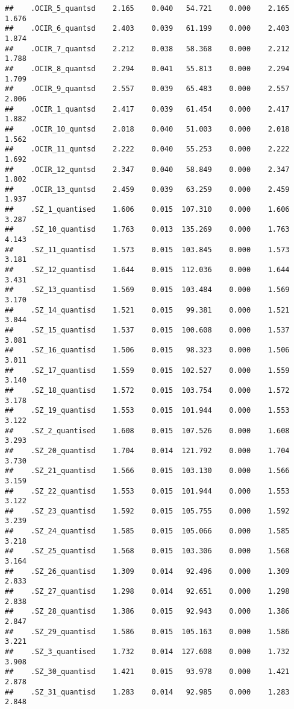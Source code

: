 \documentclass[]{article}
\begin{document}
\begin{verbatim}
##    .OCIR_5_quantsd    2.165    0.040   54.721    0.000    2.165    1.676
##    .OCIR_6_quantsd    2.403    0.039   61.199    0.000    2.403    1.874
##    .OCIR_7_quantsd    2.212    0.038   58.368    0.000    2.212    1.788
##    .OCIR_8_quantsd    2.294    0.041   55.813    0.000    2.294    1.709
##    .OCIR_9_quantsd    2.557    0.039   65.483    0.000    2.557    2.006
##    .OCIR_1_quantsd    2.417    0.039   61.454    0.000    2.417    1.882
##    .OCIR_10_quntsd    2.018    0.040   51.003    0.000    2.018    1.562
##    .OCIR_11_quntsd    2.222    0.040   55.253    0.000    2.222    1.692
##    .OCIR_12_quntsd    2.347    0.040   58.849    0.000    2.347    1.802
##    .OCIR_13_quntsd    2.459    0.039   63.259    0.000    2.459    1.937
##    .SZ_1_quantised    1.606    0.015  107.310    0.000    1.606    3.287
##    .SZ_10_quantisd    1.763    0.013  135.269    0.000    1.763    4.143
##    .SZ_11_quantisd    1.573    0.015  103.845    0.000    1.573    3.181
##    .SZ_12_quantisd    1.644    0.015  112.036    0.000    1.644    3.431
##    .SZ_13_quantisd    1.569    0.015  103.484    0.000    1.569    3.170
##    .SZ_14_quantisd    1.521    0.015   99.381    0.000    1.521    3.044
##    .SZ_15_quantisd    1.537    0.015  100.608    0.000    1.537    3.081
##    .SZ_16_quantisd    1.506    0.015   98.323    0.000    1.506    3.011
##    .SZ_17_quantisd    1.559    0.015  102.527    0.000    1.559    3.140
##    .SZ_18_quantisd    1.572    0.015  103.754    0.000    1.572    3.178
##    .SZ_19_quantisd    1.553    0.015  101.944    0.000    1.553    3.122
##    .SZ_2_quantised    1.608    0.015  107.526    0.000    1.608    3.293
##    .SZ_20_quantisd    1.704    0.014  121.792    0.000    1.704    3.730
##    .SZ_21_quantisd    1.566    0.015  103.130    0.000    1.566    3.159
##    .SZ_22_quantisd    1.553    0.015  101.944    0.000    1.553    3.122
##    .SZ_23_quantisd    1.592    0.015  105.755    0.000    1.592    3.239
##    .SZ_24_quantisd    1.585    0.015  105.066    0.000    1.585    3.218
##    .SZ_25_quantisd    1.568    0.015  103.306    0.000    1.568    3.164
##    .SZ_26_quantisd    1.309    0.014   92.496    0.000    1.309    2.833
##    .SZ_27_quantisd    1.298    0.014   92.651    0.000    1.298    2.838
##    .SZ_28_quantisd    1.386    0.015   92.943    0.000    1.386    2.847
##    .SZ_29_quantisd    1.586    0.015  105.163    0.000    1.586    3.221
##    .SZ_3_quantised    1.732    0.014  127.608    0.000    1.732    3.908
##    .SZ_30_quantisd    1.421    0.015   93.978    0.000    1.421    2.878
##    .SZ_31_quantisd    1.283    0.014   92.985    0.000    1.283    2.848

\end{verbatim}
\end{document}
